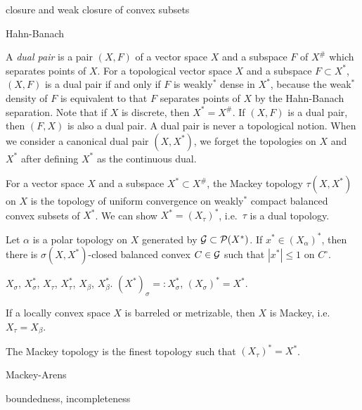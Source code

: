 \documentclass{../../large}
\begin{document}
\begin{prb}
closure and weak closure of convex subsets
\end{prb}
\begin{pf}
Hahn-Banach
\end{pf}

\begin{prb}
A \emph{dual pair} is a pair $(X,F)$ of a vector space $X$ and a subspace $F$ of $X^\#$ which separates points of $X$.
For a topological vector space $X$ and a subspace $F\subset X^*$, $(X,F)$ is a dual pair if and only if $F$ is weakly$^*$ dense in $X^*$, because the weak$^*$ density of $F$ is equivalent to that $F$ separates points of $X$ by the Hahn-Banach separation.
Note that if $X$ is discrete, then $X^*=X^\#$.
If $(X,F)$ is a dual pair, then $(F,X)$ is also a dual pair.
A dual pair is never a topological notion.
When we consider a canonical dual pair $(X,X^*)$, we forget the topologies on $X$ and $X^*$ after defining $X^*$ as the continuous dual.

For a vector space $X$ and a subspace $X^*\subset X^\#$, the Mackey topology $\tau(X,X^*)$ on $X$ is the topology of uniform convergence on weakly$^*$ compact balanced convex subsets of $X^*$.
We can show $X^*=(X_\tau)^*$, i.e.~$\tau$ is a dual topology.

Let $\alpha$ is a polar topology on $X$ generated by $\mathcal{G}\subset\mathcal{P}(X^*)$.
If $x^*\in(X_\alpha)^*$, then there is $\sigma(X,X^*)$-closed balanced convex $C\in\mathcal{G}$ such that $|x^*|\le1$ on $C^\circ$.

$X_\sigma$, $X^*_\sigma$, $X_\tau$, $X^*_\tau$, $X_\beta$, $X^*_\beta$.
$(X^*)_\sigma=:X^*_\sigma$, $(X_\sigma)^*=X^*$.

\begin{parts}
\item If a locally convex space $X$ is barreled or metrizable, then $X$ is Mackey, i.e.~$X_\tau=X_\beta$.
\item The Mackey topology is the finest topology such that $(X_\tau)^*=X^*$.
\end{parts}
\end{prb}

Mackey-Arens

boundedness, incompleteness
\end{document}
